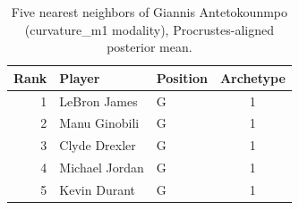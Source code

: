 \begin{table}[htbp]
  \centering\small
  \begin{tabular}{rllc}
    \toprule
    Rank & Player & Position & Archetype \\
    \midrule
    1 & LeBron James & G & 1 \\
    2 & Manu Ginobili & G & 1 \\
    3 & Clyde Drexler & G & 1 \\
    4 & Michael Jordan & G & 1 \\
    5 & Kevin Durant & G & 1 \\
    \bottomrule
  \end{tabular}
  \caption{Five nearest neighbors of Giannis Antetokounmpo (curvature_m1 modality), Procrustes-aligned posterior mean.}
  \label{tab:Giannis_Antetokounmpo_neighbors_curvature_m1}
\end{table}


